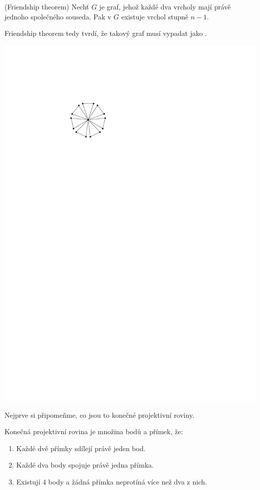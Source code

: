 \vt (Friendship theorem) Nechť $G$ je graf, jehož každé dva vrcholy mají právě jednoho společného souseda. Pak v $G$ existuje vrchol stupně $n-1$.

Friendship theorem tedy tvrdí, že takový graf musí vypadat jako .

\begin{center}
\includegraphics{friendship.pdf}
\end{center}

\dk Nejprve si připomeňme, co jsou to konečné projektivní roviny.

\df Konečná projektivní rovina je množina bodů a přímek, že:
\begin{enumerate}
	\item Každé dvě přímky sdílejí právě jeden bod.
	\item Každé dva body spojuje právě jedna přímka.
	\item Existují 4 body a žádná přímka neprotíná více než dva z nich.
\end{enumerate}

